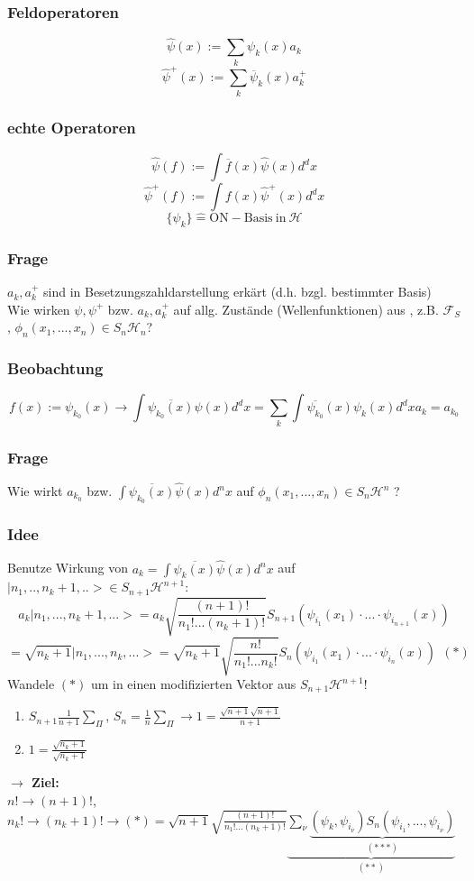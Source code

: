 \documentclass[twoside,a4paper]{scrartcl}
\renewcommand{\1}{\mathds{1}}
\newcommand{\ra}{\rightarrow}
\renewcommand{\H}{\mathcal{H}}
\newcommand{\F}{\mathcal{F}}
\begin{document}
\subsubsection*{Feldoperatoren}
$$\hat \psi(x):= \sum_k \psi_k(x)a_k$$
$$\hat \psi^+(x):= \sum_k \overline{\psi}_k(x)a_k^+$$
\subsubsection*{echte Operatoren}
$$\hat \psi(f):= \int \overline{f}(x)\hat \psi(x)d^dx$$
$$\hat \psi^+(f):= \int {f}(x)\hat \psi^+(x)d^dx$$
$$\{\psi_k\} \mathrel{\widehat{=}} \mathrm{ON-Basis \ in}\  \H$$
\subsubsection*{Frage}
$a_k,a_k^+$ sind in Besetzungszahldarstellung erkärt (d.h. bzgl. bestimmter Basis)\\
Wie wirken $\psi,\psi^+$ bzw. $a_k,a_k^+$ auf allg. Zustände (Wellenfunktionen) aus , z.B. $\F_S$, $\phi_n(x_1,...,x_n)\in S_n\H_n$?
\subsubsection*{Beobachtung}
$$f(x):= \psi_{k_0}(x) \ra \int \overline{\psi_{k_0}(x)}\hat \psi(x)d^dx=\sum_k \int \overline{\psi_{k_0}}(x)\psi_k(x)d^dx a_k=a_{k_0}$$
\subsubsection*{Frage}
Wie wirkt $a_{k_0}$ bzw. $\int \overline{\psi_{k_0}(x)}\hat \psi(x)d^nx$ auf $\phi_n(x_1,...,x_n)\in S_n\H^n$ ?
\subsubsection*{Idee}
Benutze Wirkung von $a_k=\int \overline{\psi_{k}(x)}\hat \psi(x)d^nx$ auf $|n_1,..,n_k+1,..>\in S_{n+1}\H^{n+1}$:
$$a_k|n_1,...,n_k+1,...>=a_k \sqrt{\frac{(n+1)!}{n_1!...(n_k+1)!}}S_{n+1}(\psi_{i_1}(x_1)\cdot ... \cdot \psi_{i_{n+1}}(x))$$
$$=\sqrt{n_k+1}|n_1,...,n_k,...>=\sqrt{n_k+1} \sqrt{\frac{n!}{n_1!...n_k!}}S_{n}(\psi_{i_1}(x_1)\cdot ... \cdot \psi_{i_{n}}(x))  \ \ (*)$$
Wandele $(*)$ um in einen modifizierten Vektor aus $S_{n+1}\H^{n+1}$!
\begin{enumerate}
\item $S_{n+1}\frac{1}{n+1} \sum_\Pi$, $S_n=\frac{1}{n}\sum_\Pi \ra 1=\frac{\sqrt{n+1}\sqrt{n+1}}{n+1}$
\item $1=\frac{\sqrt{n_k+1}}{\sqrt{n_k+1}}$
\end{enumerate}
\textbf{$\ra$ Ziel:}\\
$n! \ra (n+1)!$, $n_k! \ra (n_k+1)! \ra (*)=\sqrt{n+1}\sqrt{\frac{(n+1)!}{n_1!...(n_k+1)!}} \underbrace{\sum_\nu \underbrace{(\psi_k,\psi_{i_\nu})S_n(\psi_{i_1},...,\psi_{i_\nu})}_{(***)} }_{(**)}$
\end{document}
